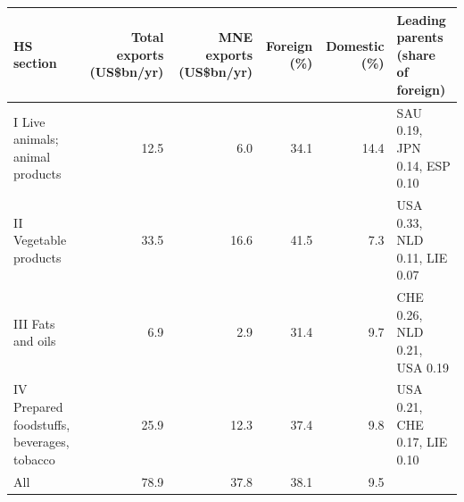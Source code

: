 \begin{tabular}{@{}l r r r r l@{}}
\toprule
HS section & Total exports (US\$bn/yr) & MNE exports (US\$bn/yr) & Foreign (\%) & Domestic (\%) & Leading parents (share of foreign) \\
\midrule
I Live animals; animal products & 12.5 & 6.0 & 34.1 & 14.4 & SAU 0.19, JPN 0.14, ESP 0.10 \\
II Vegetable products & 33.5 & 16.6 & 41.5 & 7.3 & USA 0.33, NLD 0.11, LIE 0.07 \\
III Fats and oils & 6.9 & 2.9 & 31.4 & 9.7 & CHE 0.26, NLD 0.21, USA 0.19 \\
IV Prepared foodstuffs, beverages, tobacco & 25.9 & 12.3 & 37.4 & 9.8 & USA 0.21, CHE 0.17, LIE 0.10 \\
\midrule
All & 78.9 & 37.8 & 38.1 & 9.5 & \\
\bottomrule
\end{tabular}
